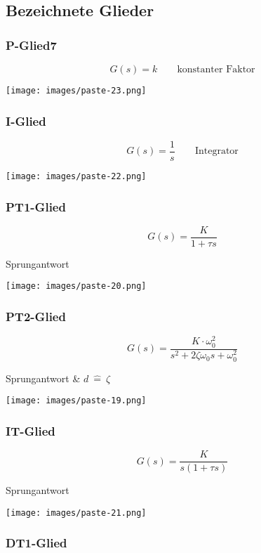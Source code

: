 \documentclass[
  10pt,
  a4paper,
  twocolumn]{article}
\numberwithin{equation}{section}
\begin{document}
\subsection{Bezeichnete Glieder}\label{bezeichnete-glieder}

\subsubsection{P-Glied7}\label{p-glied7}

\[
G(s)=k\qquad \text{konstanter Faktor}
\]

\texttt{[image: images/paste-23.png]}

\subsubsection{I-Glied}\label{i-glied}

\[
G(s)=\frac1{s}\qquad\text{Integrator}
\]

\texttt{[image: images/paste-22.png]}

\subsubsection{PT1-Glied}\label{pt1-glied}

\[
G(s)=\frac{K}{1+\tau s}
\]

Sprungantwort

\texttt{[image: images/paste-20.png]}

\subsubsection{PT2-Glied}\label{pt2-glied}

\[
G(s)=\frac{K\cdot \omega_0^2}{s^2+2\zeta\omega_0 s+\omega_0^2}
\]

Sprungantwort \& \(d\ \hat{=}\ \zeta\)

\texttt{[image: images/paste-19.png]}

\subsubsection{IT-Glied}\label{it-glied}

\[
G(s)=\frac{K}{s(1+\tau s)}
\]

Sprungantwort

\texttt{[image: images/paste-21.png]}

\subsubsection{DT1-Glied}\label{dt1-glied}
\end{document}
